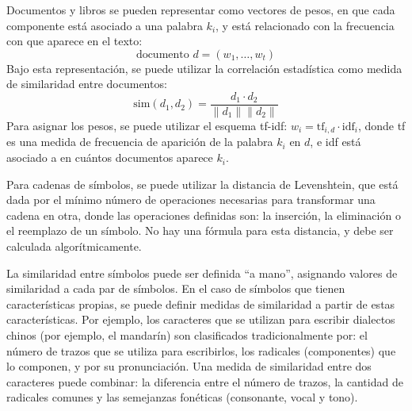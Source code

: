 \documentclass[spanish]{article}
\newcommand{\norm}[1]{\lVert#1\rVert}
\begin{document}
\begin{itemize}
            Documentos y libros se pueden representar como vectores de pesos, en que cada componente
            está asociado a una palabra $k_i$, y está relacionado con la frecuencia con que aparece en el
            texto:
            \begin{equation}
                \text{documento $d$} = (w_1, \ldots, w_t)
            \end{equation}
            Bajo esta representación, se puede utilizar la correlación estadística como medida de
            similaridad entre documentos:
            \begin{equation}
                \text{sim}(d_1, d_2) = \frac{d_1\cdot d_2}{\norm{d_1}\norm{d_2}}
            \end{equation}
            Para asignar los pesos, se puede utilizar el esquema tf-idf:  $w_i =
            \text{tf}_{i,d}\cdot\text{idf}_i$, donde tf es una medida de
            frecuencia de aparición de la palabra $k_i$ en $d$, e idf está
            asociado a en cuántos documentos aparece $k_i$.~\footnotemark

            Para cadenas de símbolos, se puede utilizar la distancia de
            Levenshtein, que está dada por el mínimo número de operaciones
            necesarias para transformar una cadena en otra, donde las
            operaciones definidas son: la inserción, la eliminación o el
            reemplazo de un símbolo.  No hay una fórmula para esta distancia, y
            debe ser calculada algorítmicamente.

            La similaridad entre símbolos puede ser definida ``a mano'',
            asignando valores de similaridad a cada par de símbolos.  En el caso
            de símbolos que tienen características propias, se puede definir
            medidas de similaridad a partir de estas características.  Por
            ejemplo, los caracteres que se utilizan para escribir dialectos
            chinos (por ejemplo, el mandarín) son clasificados tradicionalmente
            por: el número de trazos que se utiliza para escribirlos, los
            radicales (componentes) que lo componen, y por su pronunciación.
            Una medida de similaridad entre dos caracteres puede combinar:
            la diferencia entre el número de trazos, la cantidad de radicales
            comunes y las semejanzas fonéticas (consonante, vocal y tono).

    \end{itemize}
\end{document}
